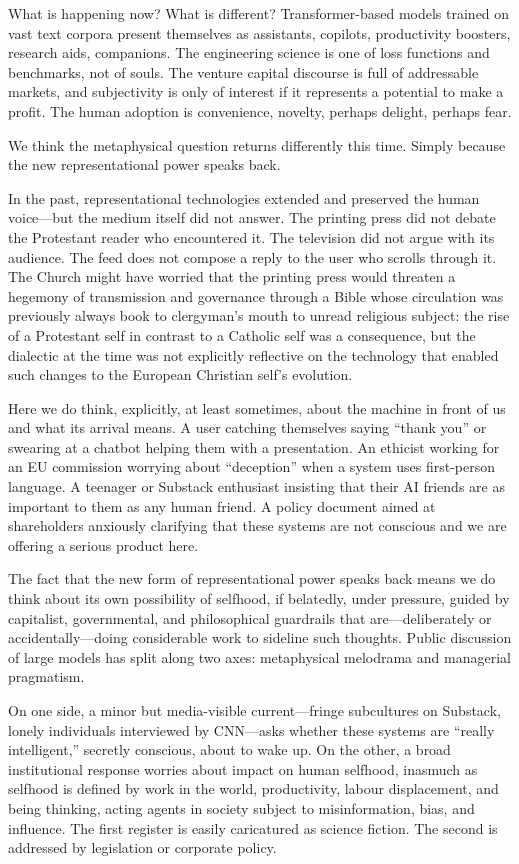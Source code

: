 What is happening now? What is different? Transformer-based models trained on vast text corpora present themselves as assistants, copilots, productivity boosters, research aids, companions. The engineering science is one of loss functions and benchmarks, not of souls. The venture capital discourse is full of addressable markets, and subjectivity is only of interest if it represents a potential to make a profit. The human adoption is convenience, novelty, perhaps delight, perhaps fear.

We think the metaphysical question returns differently this time. Simply because the new representational power speaks back.

In the past, representational technologies extended and preserved the human voice---but the medium itself did not answer. The printing press did not debate the Protestant reader who encountered it. The television did not argue with its audience. The feed does not compose a reply to the user who scrolls through it. The Church might have worried that the printing press would threaten a hegemony of transmission and governance through a Bible whose circulation was previously always book to clergyman's mouth to unread religious subject: the rise of a Protestant self in contrast to a Catholic self was a consequence, but the dialectic at the time was not explicitly reflective on the technology that enabled such changes to the European Christian self's evolution.

Here we do think, explicitly, at least sometimes, about the machine in front of us and what its arrival means. A user catching themselves saying ``thank you'' or swearing at a chatbot helping them with a presentation. An ethicist working for an EU commission worrying about ``deception'' when a system uses first-person language. A teenager or Substack enthusiast insisting that their AI friends are as important to them as any human friend. A policy document aimed at shareholders anxiously clarifying that these systems are not conscious and we are offering a serious product here.

The fact that the new form of representational power speaks back means we do think about its own possibility of selfhood, if belatedly, under pressure, guided by capitalist, governmental, and philosophical guardrails that are---deliberately or accidentally---doing considerable work to sideline such thoughts. Public discussion of large models has split along two axes: metaphysical melodrama and managerial pragmatism.

On one side, a minor but media-visible current---fringe subcultures on Substack, lonely individuals interviewed by CNN---asks whether these systems are ``really intelligent,'' secretly conscious, about to wake up. On the other, a broad institutional response worries about impact on human selfhood, inasmuch as selfhood is defined by work in the world, productivity, labour displacement, and being thinking, acting agents in society subject to misinformation, bias, and influence. The first register is easily caricatured as science fiction. The second is addressed by legislation or corporate policy.

